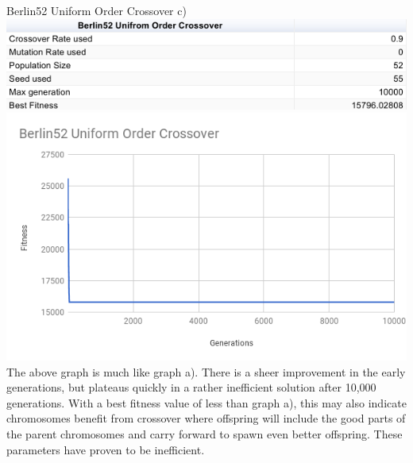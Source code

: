 \documentclass[conference]{IEEEtran}
\begin{document}
Berlin52 Uniform Order Crossover c)
\includegraphics[scale=0.42]{Berlin52/UOC/Berlin52_UOC_c)_table}
\includegraphics[scale=0.42]{Berlin52/UOC/Berlin52_UOC_c)}
The above graph is much like graph a). There is a sheer improvement in the early generations, but plateaus quickly in a rather inefficient solution after 10,000 generations. With a best fitness value of less than graph a), this may also indicate chromosomes benefit from crossover where offspring will include the good parts of the parent chromosomes and carry forward to spawn even better offspring. These parameters have proven to be inefficient.\\
\end{document}
